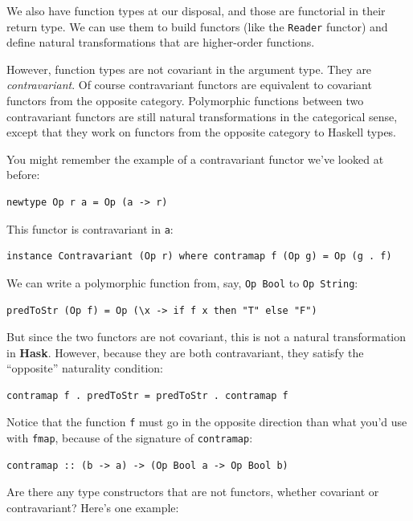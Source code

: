 We also have function types at our disposal, and those are functorial in
their return type. We can use them to build functors (like the
\texttt{Reader} functor) and define natural transformations that are
higher-order functions.

However, function types are not covariant in the argument type. They are
\emph{contravariant}. Of course contravariant functors are equivalent to
covariant functors from the opposite category. Polymorphic functions
between two contravariant functors are still natural transformations in
the categorical sense, except that they work on functors from the
opposite category to Haskell types.

You might remember the example of a contravariant functor we've looked
at before:

\begin{verbatim}
newtype Op r a = Op (a -> r)
\end{verbatim}

This functor is contravariant in \texttt{a}:

\begin{verbatim}
instance Contravariant (Op r) where contramap f (Op g) = Op (g . f)
\end{verbatim}

We can write a polymorphic function from, say, \texttt{Op\ Bool} to
\texttt{Op\ String}:

\begin{verbatim}
predToStr (Op f) = Op (\x -> if f x then "T" else "F")
\end{verbatim}

But since the two functors are not covariant, this is not a natural
transformation in \textbf{Hask}. However, because they are both
contravariant, they satisfy the ``opposite'' naturality condition:

\begin{verbatim}
contramap f . predToStr = predToStr . contramap f
\end{verbatim}

Notice that the function \texttt{f} must go in the opposite direction
than what you'd use with \texttt{fmap}, because of the signature of
\texttt{contramap}:

\begin{verbatim}
contramap :: (b -> a) -> (Op Bool a -> Op Bool b)
\end{verbatim}

Are there any type constructors that are not functors, whether covariant
or contravariant? Here's one example:

